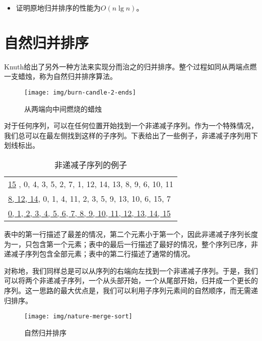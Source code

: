 \documentclass{ctexart}
\begin{document}
\begin{Exercise}
\begin{itemize}
\item 证明原地归并排序的性能为$O(n \lg n)$。
\end{itemize}
\end{Exercise}

\section{自然归并排序}

Knuth给出了另外一种方法来实现分而治之的归并排序。整个过程如同从两端点燃一支蜡烛\cite{TAOCP}，称为自然归并排序算法。

\begin{figure}[htbp]
 \centering
 \texttt{[image: img/burn-candle-2-ends]}
 \caption{从两端向中间燃烧的蜡烛}
 \label{fig:burn-candle}
\end{figure}

对于任何序列，可以在任何位置开始找到一个非递减子序列。作为一个特殊情况，我们总可以在最左侧找到这样的子序列。下表给出了一些例子，非递减子序列用下划线标出。

\begin{table}[htbp]
\centering
\begin{tabular}{ | l |}
\hline
\underline{15} , 0, 4, 3, 5, 2, 7, 1, 12, 14, 13, 8, 9, 6, 10, 11 \\
\underline{8, 12, 14}, 0, 1, 4, 11, 2, 3, 5, 9, 13, 10, 6, 15, 7 \\
\underline{0, 1, 2, 3, 4, 5, 6, 7, 8, 9, 10, 11, 12, 13, 14, 15} \\
\hline
\end{tabular}
\caption{非递减子序列的例子} %
\end{table}

表中的第一行描述了最差的情况，第二个元素小于第一个，因此非递减子序列长度为一，只包含第一个元素；表中的最后一行描述了最好的情况，整个序列已序，非递减子序列包含全部元素；表中的第二行描述了通常的情况。

对称地，我们同样总是可以从序列的右端向左找到一个非递减子序列。于是，我们可以将两个非递减子序列，一个从头部开始，一个从尾部开始，归并成一个更长的序列。这一思路的最大优点是，我们可以利用子序列元素间的自然顺序，而无需递归排序。

\begin{figure}[htbp]
 \centering
 \texttt{[image: img/nature-merge-sort]}
 \caption{自然归并排序}
 \label{fig:nature-merge-sort}
\end{figure}
\end{document}
